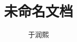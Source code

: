 \documentclass[14pt,a4paper]{extarticle}
\title{未命名文档}
\author{于润熙}
\date{}
\begin{document}
\begin{CJK*}{UTF8}{gbsn}
\maketitle



\end{CJK*}
\end{document}
